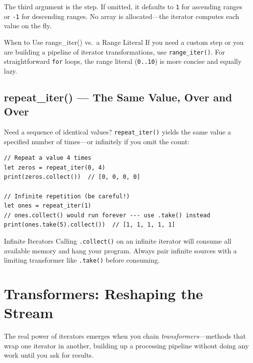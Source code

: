 The third argument is the step.
If omitted, it defaults to \lstinline|1| for ascending ranges or \lstinline|-1| for descending ranges.
No array is allocated---the iterator computes each value on the fly.

\begin{tipbox}{When to Use range\_iter() vs.\ a Range Literal}
If you need a custom step or you are building a pipeline of iterator transformations, use \lstinline|range_iter()|.
For straightforward \lstinline|for| loops, the range literal (\lstinline|0..10|) is more concise and equally lazy.
\end{tipbox}

\subsection{repeat\_iter() --- The Same Value, Over and Over}\label{subsec:repeat-iter}

Need a sequence of identical values?
\lstinline|repeat_iter()| yields the same value a specified number of times---or infinitely if you omit the count:

\begin{lstlisting}[language=Lattice, caption={Repeating a value}]
// Repeat a value 4 times
let zeros = repeat_iter(0, 4)
print(zeros.collect())  // [0, 0, 0, 0]

// Infinite repetition (be careful!)
let ones = repeat_iter(1)
// ones.collect() would run forever --- use .take() instead
print(ones.take(5).collect())  // [1, 1, 1, 1, 1]
\end{lstlisting}

\begin{warnbox}{Infinite Iterators}
Calling \lstinline|.collect()| on an infinite iterator will consume all available memory and hang your program.
Always pair infinite sources with a limiting transformer like \lstinline|.take()| before consuming.
\end{warnbox}

\section{Transformers: Reshaping the Stream}\label{sec:iterator-transformers}

The real power of iterators emerges when you chain \emph{transformers}---methods that wrap one iterator in another, building up a processing pipeline without doing any work until you ask for results.

